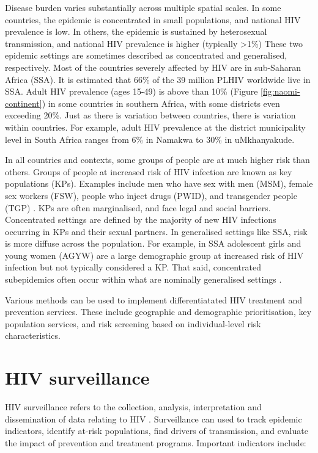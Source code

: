 \documentclass[a4paper, nobind]{templates/ociamthesis}
\begin{document}
Disease burden varies substantially across multiple spatial scales.
In some countries, the epidemic is concentrated in small populations, and national HIV prevalence is low.
In others, the epidemic is sustained by heterosexual transmission, and national HIV prevalence is higher (typically \textgreater1\%)
These two epidemic settings are sometimes described as concentrated and generalised, respectively.
Most of the countries severely affected by HIV are in sub-Saharan Africa (SSA).
It is estimated that 66\% of the 39 million PLHIV worldwide live in SSA.
Adult HIV prevalence (ages 15-49) is above than 10\% (Figure \ref{fig:naomi-continent}) in some countries in southern Africa, with some districts even exceeding 20\%.
Just as there is variation between countries, there is variation within countries.
For example, adult HIV prevalence at the district municipality level in South Africa ranges from 6\% in Namakwa to 30\% in uMkhanyakude.

In all countries and contexts, some groups of people are at much higher risk than others.
Groups of people at increased risk of HIV infection are known as key populations (KPs).
Examples include men who have sex with men (MSM), female sex workers (FSW), people who inject drugs (PWID), and transgender people (TGP) \autocite{stevens2022key}.
KPs are often marginalised, and face legal and social barriers.
Concentrated settings are defined by the majority of new HIV infections occurring in KPs and their sexual partners.
In generalised settings like SSA, risk is more diffuse across the population.
For example, in SSA adolescent girls and young women (AGYW) are a large demographic group at increased risk of HIV infection \autocite{risher2021age,monod2023growing} but not typically considered a KP.
That said, concentrated subepidemics often occur within what are nominally generalised settings \autocite{tanser2014concentrated}.

Various methods can be used to implement differentiatated HIV treatment and prevention services.
These include geographic and demographic prioritisation, key population services, and risk screening based on individual-level risk characteristics.

\hypertarget{surveillance}{%
\section{HIV surveillance}\label{surveillance}}

HIV surveillance refers to the collection, analysis, interpretation and dissemination of data relating to HIV \autocite{pisani2003hiv}.
Surveillance can used to track epidemic indicators, identify at-risk populations, find drivers of transmission, and evaluate the impact of prevention and treatment programs.
Important indicators include:
\end{document}
